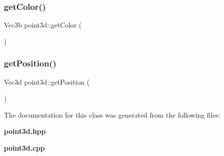 \subsubsection{get\+Color()}
{\footnotesize\ttfamily Vec3b point3d\+::get\+Color (\begin{DoxyParamCaption}{ }\end{DoxyParamCaption})}

\mbox{\label{classpoint3d_abde5a74021350422e880806284eb4b73}} 
\subsubsection{get\+Position()}
{\footnotesize\ttfamily Vec3d point3d\+::get\+Position (\begin{DoxyParamCaption}{ }\end{DoxyParamCaption})}



The documentation for this class was generated from the following files\+:\begin{DoxyCompactItemize}
\item 
\textbf{ point3d.\+hpp}\item 
\textbf{ point3d.\+cpp}\end{DoxyCompactItemize}
